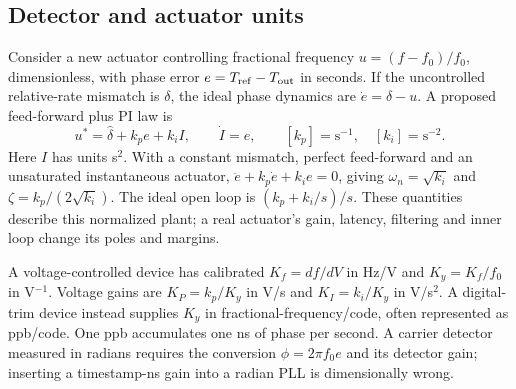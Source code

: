 \documentclass[11pt,letterpaper]{article}
\begin{document}
\subsection{Detector and actuator units}
Consider a new actuator controlling fractional frequency $u=(f-f_0)/f_0$, dimensionless, with phase error $e=T_{\rm ref}-T_{\rm out}$ in seconds. If the uncontrolled relative-rate mismatch is $\delta$, the ideal phase dynamics are $\dot e=\delta-u$. A proposed feed-forward plus PI law is
\begin{equation}
 u^*=\widehat\delta+k_p e+k_i I,\qquad \dot I=e,\qquad
 [k_p]=\mathrm{s}^{-1},\quad[k_i]=\mathrm{s}^{-2}.\label{eq:pi}
\end{equation}
Here $I$ has units s$^2$. With a constant mismatch, perfect feed-forward and an unsaturated instantaneous actuator, $\ddot e+k_p\dot e+k_i e=0$, giving $\omega_n=\sqrt{k_i}$ and $\zeta=k_p/(2\sqrt{k_i})$. The ideal open loop is $(k_p+k_i/s)/s$. These quantities describe this normalized plant; a real actuator's gain, latency, filtering and inner loop change its poles and margins.

A voltage-controlled device has calibrated $K_f=df/dV$ in Hz/V and $K_y=K_f/f_0$ in V$^{-1}$. Voltage gains are $K_P=k_p/K_y$ in V/s and $K_I=k_i/K_y$ in V/s$^2$. A digital-trim device instead supplies $K_y$ in fractional-frequency/code, often represented as ppb/code. One ppb accumulates one ns of phase per second. A carrier detector measured in radians requires the conversion $\phi=2\pi f_0e$ and its detector gain; inserting a timestamp-ns gain into a radian PLL is dimensionally wrong.
\end{document}
